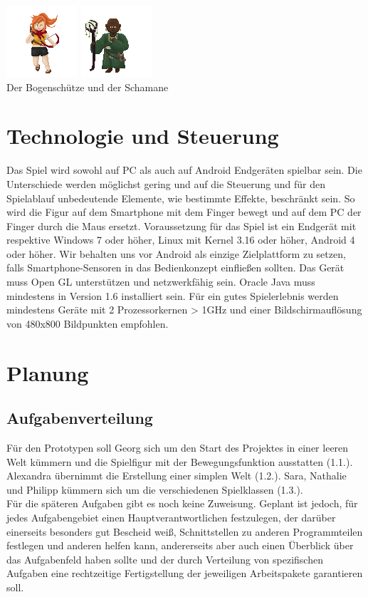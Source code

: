 \documentclass[10pt,a4paper,notitlepage]{report}
\begin{document}
\begin{flushleft}
\begin{center}
	\includegraphics[scale=2]{Bogenschuetze}
	\includegraphics[scale=2]{Schamane}\\
	Der Bogenschütze und der Schamane\\

	\end{center}
\chapter{Technologie und Steuerung}
Das Spiel wird sowohl auf PC als auch auf Android Endgeräten spielbar sein. Die Unterschiede werden möglichst gering und auf die Steuerung und für den Spielablauf unbedeutende Elemente, wie bestimmte Effekte, beschränkt sein. So wird die Figur auf dem Smartphone mit dem Finger bewegt und auf dem PC der Finger durch die Maus ersetzt.
Voraussetzung für das Spiel ist ein Endgerät mit respektive Windows 7 oder höher, Linux mit Kernel 3.16 oder höher, Android 4 oder höher. Wir behalten uns vor Android als einzige Zielplattform zu setzen, falls Smartphone-Sensoren in das Bedienkonzept einfließen sollten. Das Gerät muss Open GL unterstützen und netzwerkfähig sein. Oracle Java muss mindestens in Version 1.6 installiert sein. Für ein gutes Spielerlebnis werden mindestens Geräte mit 2 Prozessorkernen > 1GHz und einer Bildschirmauflösung von 480x800 Bildpunkten empfohlen.

\chapter{Planung}
\section{Aufgabenverteilung}
Für den Prototypen soll Georg sich um den Start des Projektes in einer leeren Welt kümmern und die Spielfigur mit der Bewegungsfunktion ausstatten (1.1.). Alexandra übernimmt die Erstellung einer simplen Welt (1.2.). Sara, Nathalie und Philipp kümmern sich um die verschiedenen Spielklassen (1.3.).\\
Für die späteren Aufgaben gibt es noch keine Zuweisung. Geplant ist jedoch, für jedes Aufgabengebiet einen Hauptverantwortlichen festzulegen, der darüber einerseits besonders gut Bescheid weiß, Schnittstellen zu anderen Programmteilen festlegen und anderen helfen kann, andererseits aber auch einen Überblick über das Aufgabenfeld haben sollte und der durch Verteilung von spezifischen Aufgaben eine rechtzeitige Fertigstellung der jeweiligen Arbeitspakete garantieren soll.\\

\end{flushleft}
\end{document}
